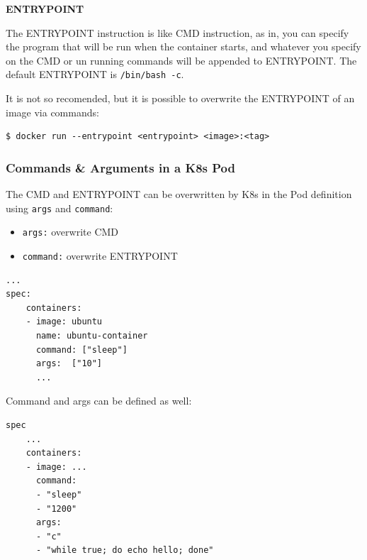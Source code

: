 \documentclass{article}
\newenvironment{blocktemplate}[1]{%
    \tcolorbox[beamer,%
    noparskip,breakable,
    colframe=Blue,%
    colbacklower=LimeGreen!75!LightGreen,%
    title=#1]}%
    {\endtcolorbox}
\newenvironment{blocktemplateII}[1]{%
    \tcolorbox[beamer,%
    noparskip,breakable,
    colframe=Green,%
    colbacklower=LimeGreen!75!LightGreen,%
    title=#1]}%
    {\endtcolorbox}
\newenvironment{codetemplate}[1][]{%
  \mybasecolorbox[#1]
  \itshape
}{%
  \endmybasecolorbox
}
\begin{document}
\textbf{ENTRYPOINT}

The ENTRYPOINT instruction is like CMD instruction, as in, you can specify the program that will be run when the container starts, and whatever you specify on the CMD or un running commands will be appended to ENTRYPOINT. The default ENTRYPOINT is \verb|/bin/bash -c|.

\begin{blocktemplate}{NOTE}
It is not so recomended, but it is possible to overwrite the ENTRYPOINT of an image via commands:
\begin{codetemplate}{}
\begin{verbatim}
$ docker run --entrypoint <entrypoint> <image>:<tag> 
\end{verbatim}
\end{codetemplate}

\end{blocktemplate}

\subsubsection{Commands \& Arguments in a K8s Pod}

The CMD and ENTRYPOINT can be overwritten by K8s in the Pod definition using \verb|args| and \verb|command|:
\begin{itemize}
    \item \verb|args:| overwrite CMD
    \item \verb|command:| overwrite ENTRYPOINT
\end{itemize}
\begin{codetemplate}{}
\begin{verbatim}
...
spec:
    containers:
    - image: ubuntu
      name: ubuntu-container
      command: ["sleep"]
      args:  ["10"]
      ... 
\end{verbatim}
\end{codetemplate}


\begin{blocktemplateII}{NOTE}
Command and args can be defined as well:
\begin{codetemplate}{}
\begin{verbatim}
spec
    ...
    containers:
    - image: ...
      command: 
      - "sleep"
      - "1200"
      args:
      - "c"
      - "while true; do echo hello; done"
\end{verbatim}
\end{codetemplate}
\end{blocktemplateII}
\end{document}
